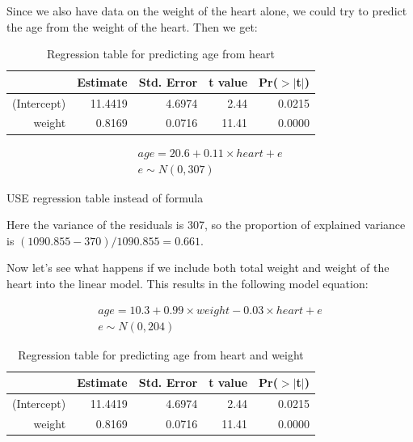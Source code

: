 \documentclass[]{book}\usepackage[]{graphicx}\usepackage[]{color}
\begin{document}
Since we also have data on the weight of the heart alone, we could try to predict the age from the weight of the heart. Then we get:

\begin{table}[ht]
\centering
\caption{Regression table for predicting age from heart} 
\label{tab:multi_2b}
\begin{tabular}{rrrrr}
  \hline
 & Estimate & Std. Error & t value & Pr($>$$|$t$|$) \\ 
  \hline
(Intercept) & 11.4419 & 4.6974 & 2.44 & 0.0215 \\ 
  weight & 0.8169 & 0.0716 & 11.41 & 0.0000 \\ 
   \hline
\end{tabular}
\end{table}


\begin{eqnarray}
age = 20.6 + 0.11 \times  heart + e \\
e \sim N(0, 307)
\end{eqnarray}

USE regression table instead of formula



Here the variance of the residuals is 307, so the proportion of explained variance is $(1090.855-370)/1090.855  = 0.661$.


Now let's see what happens if we include both total weight and weight of the heart into the linear model. This results in the following model equation:


\begin{eqnarray}
age = 10.3 + 0.99 \times  weight  -0.03 \times  heart + e \\
e \sim N(0, 204)
\end{eqnarray}

\begin{table}[ht]
\centering
\caption{Regression table for predicting age from heart and weight} 
\label{tab:multi_2c}
\begin{tabular}{rrrrr}
  \hline
 & Estimate & Std. Error & t value & Pr($>$$|$t$|$) \\ 
  \hline
(Intercept) & 11.4419 & 4.6974 & 2.44 & 0.0215 \\ 
  weight & 0.8169 & 0.0716 & 11.41 & 0.0000 \\ 
   \hline
\end{tabular}
\end{table}
\end{document}
